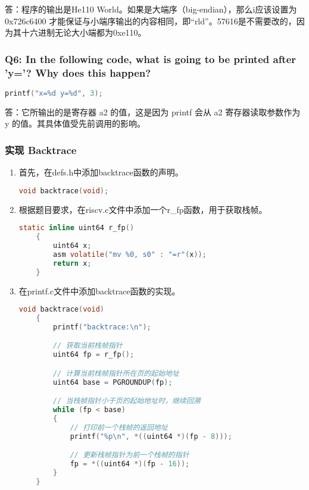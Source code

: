 答：程序的输出是He110 World。如果是大端序（big-endian），那么i应该设置为0x726c6400 才能保证与小端序输出的内容相同，即“rld”。57616是不需要改的，因为其十六进制无论大小端都为0xe110。

\subsubsection*{Q6: In the following code, what is going to be printed after 'y='? Why does this happen?}
\begin{lstlisting}[language=c, title=Code for Question]
    printf("x=%d y=%d", 3);
\end{lstlisting}

答：它所输出的是寄存器 a2 的值，这是因为 printf 会从 a2 寄存器读取参数作为
y 的值。其具体值受先前调用的影响。

\subsubsection{实现 Backtrace}
\begin{enumerate}
    \item 首先，在defs.h中添加backtrace函数的声明。
          \begin{lstlisting}[language=c, title=backtrace函数的声明]
    void backtrace(void);
    \end{lstlisting}
    \item 根据题目要求，在riscv.c文件中添加一个r\_fp函数，用于获取栈帧。
          \begin{lstlisting}[language=c, title=r\_fp函数的实现]
    static inline uint64 r_fp()
    {
        uint64 x;
        asm volatile("mv %0, s0" : "=r"(x));
        return x;
    }
    \end{lstlisting}
    \item 在printf.c文件中添加backtrace函数的实现。
          \begin{lstlisting}[language=c, title=backtrace函数的实现]
    void backtrace(void)
    {
        printf("backtrace:\n");

        // 获取当前栈帧指针
        uint64 fp = r_fp();

        // 计算当前栈帧指针所在页的起始地址
        uint64 base = PGROUNDUP(fp);

        // 当栈帧指针小于页的起始地址时，继续回溯
        while (fp < base)
        {
            // 打印前一个栈帧的返回地址
            printf("%p\n", *((uint64 *)(fp - 8)));

            // 更新栈帧指针为前一个栈帧的指针
            fp = *((uint64 *)(fp - 16));
        }
    }
    \end{lstlisting}
\end{enumerate}
